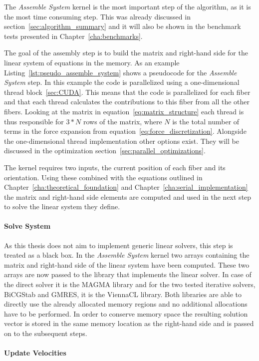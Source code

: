 The \emph{Assemble System} kernel is the most important step of the algorithm, as it is the most time consuming step. This was already discussed in section~\ref{sec:algorithm_summary} and it will also be shown in the benchmark tests presented in Chapter~\ref{cha:benchmarks}. 

The goal of the assembly step is to build the matrix and right-hand side for the linear system of equations in the memory. As an example Listing~\ref{lst:pseudo_assemble_system} shows a pseudocode for the \emph{Assemble System} step. In this example the code is parallelized using a one-dimensional thread block~\ref{sec:CUDA}. This means that the code is parallelized for each fiber and that each thread calculates the contributions to this fiber from all the other fibers. Looking at the matrix in equation~\eqref{eq:matrix_structure} each thread is thus responsible for $3*N$ rows of the matrix, where $N$ is the total number of terms in the force expansion from equation~\eqref{eq:force_discretization}. Alongside the one-dimensional thread implementation other options exist. They will be discussed in the optimization section~\ref{sec:parallel_optimizations}.

The kernel requires two inputs, the current position of each fiber and its orientation. Using these combined with the equations outlined in Chapter~\ref{cha:theoretical_foundation} and Chapter~\ref{cha:serial_implementation} the matrix and right-hand side elements are computed and used in the next step to solve the linear system they define.

\paragraph{Solve System}
As this thesis does not aim to implement generic linear solvers, this step is treated as a black box. In the \emph{Assemble System} kernel two arrays containing the matrix and right-hand side of the linear system have been computed. These two arrays are now passed to the library that implements the linear solver. In case of the direct solver it is the MAGMA library and for the two tested iterative solvers, BiCGStab and GMRES, it is the ViennaCL library. Both libraries are able to directly use the already allocated memory regions and no additional allocations have to be performed. In order to conserve memory space the resulting solution vector is stored in the same memory location as the right-hand side and is passed on to the subsequent steps.

\paragraph{Update Velocities}

